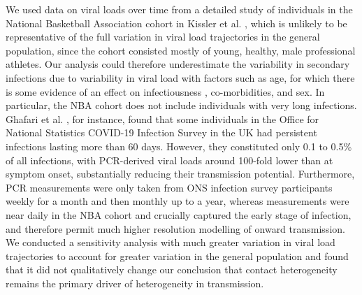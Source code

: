 \documentclass[
  10pt,
  letterpaper,
]{article}
\begin{document}
We used data on viral loads over time from a detailed study of
individuals in the National Basketball Association cohort in Kissler et
al. \citep{kissler2021}, which is unlikely to be representative of the
full variation in viral load trajectories in the general population,
since the cohort consisted mostly of young, healthy, male professional
athletes. Our analysis could therefore underestimate the variability in
secondary infections due to variability in viral load with factors such
as age, for which there is some evidence of an effect on infectiousness
\citep{ke2022}, co-morbidities, and sex. In particular, the NBA cohort
does not include individuals with very long infections. Ghafari et al.
\citep{ghafari2024}, for instance, found that some individuals in the
Office for National Statistics COVID-19 Infection Survey in the UK had
persistent infections lasting more than 60 days. However, they
constituted only 0.1 to 0.5\% of all infections, with PCR-derived viral
loads around 100-fold lower than at symptom onset, substantially
reducing their transmission potential. Furthermore, PCR measurements
were only taken from ONS infection survey participants weekly for a
month and then monthly up to a year, whereas measurements were near
daily in the NBA cohort and crucially captured the early stage of
infection, and therefore permit much higher resolution modelling of
onward transmission. We conducted a sensitivity analysis with much
greater variation in viral load trajectories to account for greater
variation in the general population and found that it did not
qualitatively change our conclusion that contact heterogeneity remains
the primary driver of heterogeneity in transmission.
\end{document}

